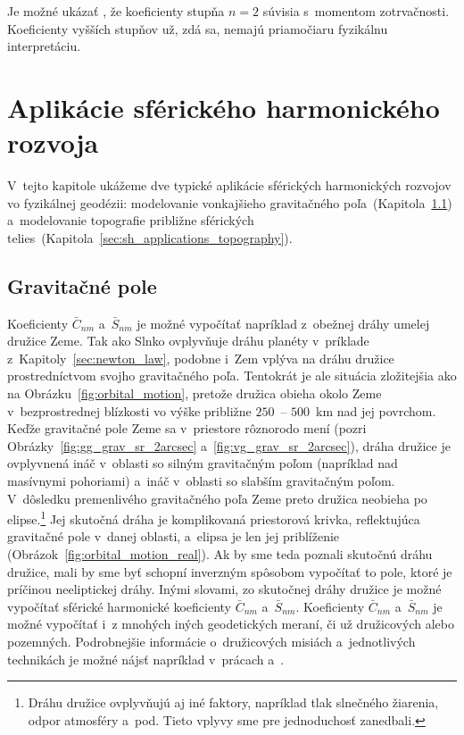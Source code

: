 \documentclass[a4paper,12pt]{book}
\begin{document}
Je možné ukázať \parencite[napríklad][]{MoritzPhysicalGeodesy}, že koeficienty
stupňa $n = 2$ súvisia s~momentom zotrvačnosti.  Koeficienty vyšších stupňov
už, zdá sa, nemajú priamočiaru fyzikálnu interpretáciu.







\section{Aplikácie sférického harmonického rozvoja}
\label{sec:spherical_harmonics_applications}

V~tejto kapitole ukážeme dve typické aplikácie sférických harmonických rozvojov 
vo fyzikálnej geodézii: modelovanie vonkajšieho gravitačného 
poľa~(Kapitola~\ref{sec:sh_applications_gravity_field})
a~modelovanie topografie približne sférických 
telies~(Kapitola~\ref{sec:sh_applications_topography}).

\subsection{Gravitačné pole}
\label{sec:sh_applications_gravity_field}

Koeficienty $\bar{C}_{nm}$ a~$\bar{S}_{nm}$ je možné vypočítať napríklad
z~obežnej dráhy umelej družice Zeme.  Tak ako Slnko ovplyvňuje dráhu planéty
v~príklade z~Kapitoly~\ref{sec:newton_law}, podobne i~Zem vplýva na dráhu
družice prostredníctvom svojho gravitačného poľa.  Tentokrát je ale situácia
zložitejšia ako na Obrázku~\ref{fig:orbital_motion}, pretože družica obieha
okolo Zeme v~bezprostrednej blízkosti vo výške približne $250$~-- $500$~km nad
jej povrchom.  Keďže gravitačné pole Zeme sa v~priestore rôznorodo mení (pozri
Obrázky~\ref{fig:gg_grav_sr_2arcsec} a~\ref{fig:vg_grav_sr_2arcsec}), dráha
družice je ovplyvnená ináč v~oblasti so silným gravitačným poľom (napríklad nad
masívnymi pohoriami) a~ináč v~oblasti so slabším gravitačným poľom.  V~dôsledku
premenlivého gravitačného poľa Zeme preto družica neobieha po
elipse.\footnote{Dráhu družice ovplyvňujú aj iné faktory, napríklad tlak
slnečného žiarenia, odpor atmosféry a~pod.  Tieto vplyvy sme pre jednoduchosť
zanedbali.}  Jej skutočná dráha je komplikovaná priestorová krivka,
reflektujúca gravitačné pole v~danej oblasti, a~elipsa je len jej priblíženie
(Obrázok~\ref{fig:orbital_motion_real}).  Ak by sme teda poznali skutočnú dráhu
družice, mali by sme byť schopní inverzným spôsobom vypočítať to pole, ktoré je
príčinou neeliptickej dráhy.  Inými slovami, zo skutočnej dráhy družice je
možné vypočítať sférické harmonické koeficienty $\bar{C}_{nm}$
a~$\bar{S}_{nm}$.  Koeficienty $\bar{C}_{nm}$ a~$\bar{S}_{nm}$ je možné
vypočítať i~z mnohých iných geodetických meraní, či už družicových alebo
pozemných.  Podrobnejšie informácie o~družicových misiách a~jednotlivých
technikách je možné nájsť napríklad v~prácach \textcite{SeeberSatelliteGeodesy}
a~\textcite{MoritzPhysicalGeodesy}.
\end{document}
